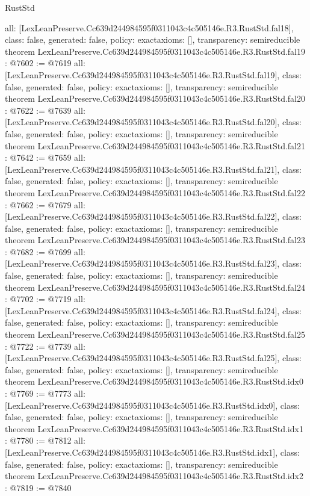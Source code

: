 \begin{lexlean}{RustStd}
\begin{coremodule}
{  all: [LexLeanPreserve.Cc639d244984595f0311043c4c505146e.R3.RustStd.fal18],
  class: false,
  generated: false,
  policy: exact{axioms: []},
  transparency: semireducible
}
theorem LexLeanPreserve.Cc639d244984595f0311043c4c505146e.R3.RustStd.fal19 : @7602 := @7619 {
  all: [LexLeanPreserve.Cc639d244984595f0311043c4c505146e.R3.RustStd.fal19],
  class: false,
  generated: false,
  policy: exact{axioms: []},
  transparency: semireducible
}
theorem LexLeanPreserve.Cc639d244984595f0311043c4c505146e.R3.RustStd.fal20 : @7622 := @7639 {
  all: [LexLeanPreserve.Cc639d244984595f0311043c4c505146e.R3.RustStd.fal20],
  class: false,
  generated: false,
  policy: exact{axioms: []},
  transparency: semireducible
}
theorem LexLeanPreserve.Cc639d244984595f0311043c4c505146e.R3.RustStd.fal21 : @7642 := @7659 {
  all: [LexLeanPreserve.Cc639d244984595f0311043c4c505146e.R3.RustStd.fal21],
  class: false,
  generated: false,
  policy: exact{axioms: []},
  transparency: semireducible
}
theorem LexLeanPreserve.Cc639d244984595f0311043c4c505146e.R3.RustStd.fal22 : @7662 := @7679 {
  all: [LexLeanPreserve.Cc639d244984595f0311043c4c505146e.R3.RustStd.fal22],
  class: false,
  generated: false,
  policy: exact{axioms: []},
  transparency: semireducible
}
theorem LexLeanPreserve.Cc639d244984595f0311043c4c505146e.R3.RustStd.fal23 : @7682 := @7699 {
  all: [LexLeanPreserve.Cc639d244984595f0311043c4c505146e.R3.RustStd.fal23],
  class: false,
  generated: false,
  policy: exact{axioms: []},
  transparency: semireducible
}
theorem LexLeanPreserve.Cc639d244984595f0311043c4c505146e.R3.RustStd.fal24 : @7702 := @7719 {
  all: [LexLeanPreserve.Cc639d244984595f0311043c4c505146e.R3.RustStd.fal24],
  class: false,
  generated: false,
  policy: exact{axioms: []},
  transparency: semireducible
}
theorem LexLeanPreserve.Cc639d244984595f0311043c4c505146e.R3.RustStd.fal25 : @7722 := @7739 {
  all: [LexLeanPreserve.Cc639d244984595f0311043c4c505146e.R3.RustStd.fal25],
  class: false,
  generated: false,
  policy: exact{axioms: []},
  transparency: semireducible
}
theorem LexLeanPreserve.Cc639d244984595f0311043c4c505146e.R3.RustStd.idx0 : @7769 := @7773 {
  all: [LexLeanPreserve.Cc639d244984595f0311043c4c505146e.R3.RustStd.idx0],
  class: false,
  generated: false,
  policy: exact{axioms: []},
  transparency: semireducible
}
theorem LexLeanPreserve.Cc639d244984595f0311043c4c505146e.R3.RustStd.idx1 : @7780 := @7812 {
  all: [LexLeanPreserve.Cc639d244984595f0311043c4c505146e.R3.RustStd.idx1],
  class: false,
  generated: false,
  policy: exact{axioms: []},
  transparency: semireducible
}
theorem LexLeanPreserve.Cc639d244984595f0311043c4c505146e.R3.RustStd.idx2 : @7819 := @7840 {
}
\end{coremodule}
\end{lexlean}
